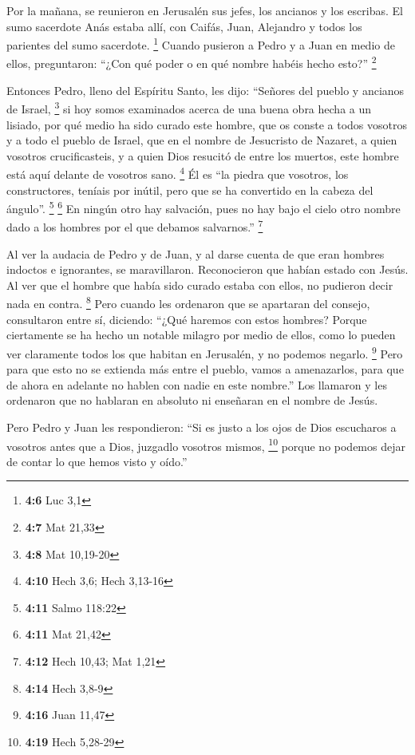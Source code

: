 \begin{paracol}{2}
 Por la mañana, se reunieron en Jerusalén sus jefes, los
ancianos y los escribas.  El sumo sacerdote Anás estaba
allí, con Caifás, Juan, Alejandro y todos los parientes del sumo
sacerdote. \footnote{\textbf{4:6} Luc 3,1}  Cuando
pusieron a Pedro y a Juan en medio de ellos, preguntaron: ``¿Con qué
poder o en qué nombre habéis hecho esto?'' \footnote{\textbf{4:7} Mat
  21,33}

 Entonces Pedro, lleno del Espíritu Santo, les dijo:
``Señores del pueblo y ancianos de Israel, \footnote{\textbf{4:8} Mat
  10,19-20}  si hoy somos examinados acerca de una buena
obra hecha a un lisiado, por qué medio ha sido curado este hombre,
 que os conste a todos vosotros y a todo el pueblo de
Israel, que en el nombre de Jesucristo de Nazaret, a quien vosotros
crucificasteis, y a quien Dios resucitó de entre los muertos, este
hombre está aquí delante de vosotros sano. \footnote{\textbf{4:10} Hech
  3,6; Hech 3,13-16}  Él es ``la piedra que vosotros, los
constructores, teníais por inútil, pero que se ha convertido en la
cabeza del ángulo''. \footnote{\textbf{4:11} Salmo 118:22} \footnote{\textbf{4:11}
  Mat 21,42}  En ningún otro hay salvación, pues no hay
bajo el cielo otro nombre dado a los hombres por el que debamos
salvarnos.'' \footnote{\textbf{4:12} Hech 10,43; Mat 1,21}

 Al ver la audacia de Pedro y de Juan, y al darse cuenta
de que eran hombres indoctos e ignorantes, se maravillaron. Reconocieron
que habían estado con Jesús.  Al ver que el hombre que
había sido curado estaba con ellos, no pudieron decir nada en contra.
\footnote{\textbf{4:14} Hech 3,8-9}  Pero cuando les
ordenaron que se apartaran del consejo, consultaron entre sí,
 diciendo: ``¿Qué haremos con estos hombres? Porque
ciertamente se ha hecho un notable milagro por medio de ellos, como lo
pueden ver claramente todos los que habitan en Jerusalén, y no podemos
negarlo. \footnote{\textbf{4:16} Juan 11,47}  Pero para
que esto no se extienda más entre el pueblo, vamos a amenazarlos, para
que de ahora en adelante no hablen con nadie en este nombre.''
 Los llamaron y les ordenaron que no hablaran en absoluto
ni enseñaran en el nombre de Jesús.

 Pero Pedro y Juan les respondieron: ``Si es justo a los
ojos de Dios escucharos a vosotros antes que a Dios, juzgadlo vosotros
mismos, \footnote{\textbf{4:19} Hech 5,28-29}  porque no
podemos dejar de contar lo que hemos visto y oído.''


\end{paracol}
